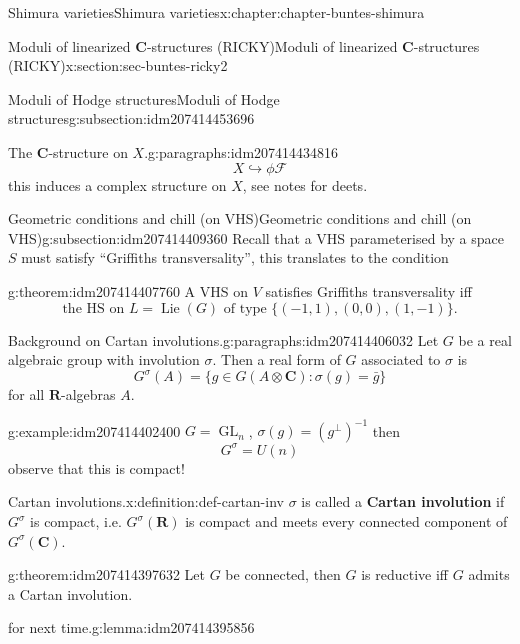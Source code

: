 \documentclass[oneside,10pt,]{book}
\newcommand{\terminology}[1]{\textbf{#1}}
\numberwithin{equation}{section}
\DeclareMathOperator{\Lie}{Lie}
\newcommand{\inv}{^{-1}}
\newcommand{\RR}{\mathbf{R}}
\newcommand{\CC}{\mathbf{C}}
\DeclareMathOperator{\GL}{GL}
\begin{document}
\begin{chapterptx}{Shimura varieties}{}{Shimura varieties}{}{}{x:chapter:chapter-buntes-shimura}
\begin{sectionptx}{Moduli of linearized \(\CC\)-structures (RICKY)}{}{Moduli of linearized \(\CC\)-structures (RICKY)}{}{}{x:section:sec-buntes-ricky2}
\begin{subsectionptx}{Moduli of Hodge structures}{}{Moduli of Hodge structures}{}{}{g:subsection:idm207414453696}
\begin{paragraphs}{The \(\CC\)-structure on \(X\).}{g:paragraphs:idm207414434816}
\begin{equation*}
X \hookrightarrow \phi \mathcal F
\end{equation*}
this induces a complex structure on \(X\), see notes for deets.%
\end{paragraphs}%
\end{subsectionptx}
%
%
\typeout{************************************************}
\typeout{************************************************}
%
\begin{subsectionptx}{Geometric conditions and chill (on VHS)}{}{Geometric conditions and chill (on VHS)}{}{}{g:subsection:idm207414409360}
Recall that a VHS parameterised by a space \(S\) must satisfy ``Griffiths transversality'', this translates to the condition%
\begin{theorem}{}{}{g:theorem:idm207414407760}%
A VHS on \(V\) satisfies Griffiths transversality iff%
\begin{equation}
\text{the HS  on } L = \Lie(G) \text{ of type }\{(-1,1),(0,0),(1,-1)\}\text{.}\label{g:men:idm207414406800}
\end{equation}
%
\end{theorem}
\begin{paragraphs}{Background on Cartan involutions.}{g:paragraphs:idm207414406032}%
Let \(G\) be a real algebraic group with involution \(\sigma\). Then a real form of \(G\)  associated to \(\sigma\) is%
\begin{equation*}
G^\sigma (A) = \{ g \in G(A \otimes \CC) : \sigma(g) = \bar g\}
\end{equation*}
for all \(\RR\)-algebras \(A\).%
\begin{example}{}{g:example:idm207414402400}%
\(G = \GL_n\), \(\sigma(g) = (g^\perp)\inv\) then%
\begin{equation*}
G^\sigma = U(n)
\end{equation*}
observe that this is compact!%
\end{example}
\begin{definition}{Cartan involutions.}{x:definition:def-cartan-inv}%
\(\sigma\) is called a \terminology{Cartan involution} if \(G^\sigma\) is compact, i.e. \(G^\sigma(\RR)\) is compact and meets every connected component of \(G^\sigma(\CC)\).%
\end{definition}
\begin{theorem}{}{}{g:theorem:idm207414397632}%
Let \(G\) be connected, then \(G\) is reductive iff \(G\) admits a Cartan involution.%
\end{theorem}
\begin{lemma}{for next time.}{}{g:lemma:idm207414395856}%

\end{lemma}
\end{paragraphs}
\end{subsectionptx}
\end{sectionptx}
\end{chapterptx}
\end{document}
